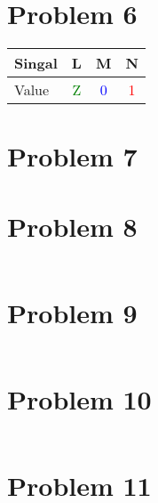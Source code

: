 \documentclass[paper=a4, fontsize=11pt]{scrartcl} %
\numberwithin{equation}{section} %
\numberwithin{figure}{section} %
\numberwithin{table}{section} %
\begin{document}

\section{Problem 6}
\center
\begin{tabular}{l || c | c | c}
	Singal & L & M & N \\ \hline
	Value & \textcolor{green}{Z} & \textcolor{blue}{0} & \textcolor{red}{1} \\
\end{tabular}


\section{Problem 7}


\section{Problem 8}
\inputminted{vhdl}{src/p8/p8.vhd}


\section{Problem 9}
\inputminted{vhdl}{src/p9/p9.vhd}


\section{Problem 10}
\inputminted{vhdl}{src/p10/p10.vhd}


\section{Problem 11}
\inputminted{vhdl}{src/p11/p11.vhd}
\inputminted{vhdl}{src/p11/register.vhd}
\end{document}
